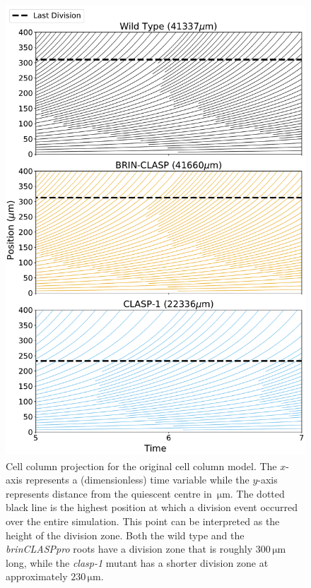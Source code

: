 \documentclass[referee,pdflatex,sn-mathphys-num]{sn-jnl}
\newcommand{\um}{\,\unit{\micro\metre}}
\begin{document}
\begin{appendices}
\begin{figure}[!htp]
  \centering
  \includegraphics[height=480pt]{column-original-profile.pdf}
  \caption{Cell column projection for the original cell column model. The $x$-axis represents a (dimensionless) time variable while the $y$-axis represents distance from the quiescent centre in $\um$. The dotted black line is the highest position at which a division event occurred over the entire simulation. This point can be interpreted as the height of the division zone. Both the wild type and the \emph{brinCLASPpro} roots have a division zone that is roughly $300\um$ long, while the \emph{clasp-1} mutant has a shorter division zone at approximately $230\um$.}
  \label{column-original-profile}
\end{figure}


\end{appendices}
\end{document}
